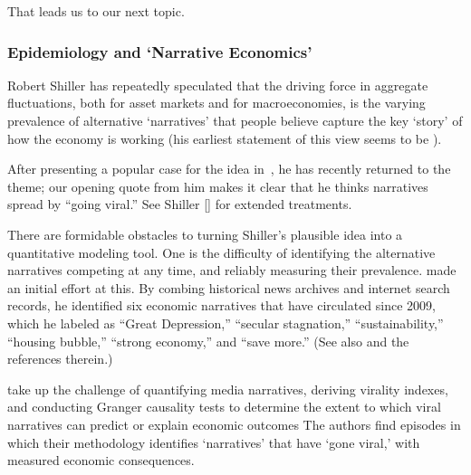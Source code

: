 That leads us to our next topic.


\hypertarget{narrativeApproach}{}
\subsubsection{Epidemiology and `Narrative Economics'}\label{narrativeApproach}

Robert Shiller has repeatedly speculated that the driving force in aggregate fluctuations, both for asset markets and for macroeconomies, is the varying prevalence of alternative `narratives' that people believe capture the key `story' of how the economy is working (his earliest statement of this view seems to be ).

After presenting a popular case for the idea in~\cite{akerlof2010animal}, he has recently returned to the theme; our opening quote from him makes it clear that he thinks narratives spread by ``going viral.''  See Shiller [\citeyear{shiller2017narrative,shiller_narrative_2019}] for extended treatments.

There are formidable obstacles to turning Shiller's plausible idea into a quantitative modeling tool.  One is the difficulty of identifying the alternative narratives competing at any time, and reliably measuring their prevalence.
 made an initial effort at this.  By combing historical news archives and internet search records, he identified six economic narratives that have circulated since 2009, which he labeled as ``Great Depression,'' ``secular stagnation,'' ``sustainability,'' ``housing bubble,'' ``strong economy,'' and ``save more.''  (See also  \cite{ash2021text} and \cite{andre2022narratives} the references therein.)

\cite{larsen2019business} take up the challenge of quantifying media narratives, deriving virality indexes, and conducting Granger causality tests to determine the extent to which viral narratives can predict or explain economic outcomes  The authors find episodes in which their methodology identifies `narratives' that have `gone viral,' with measured economic consequences.  %


